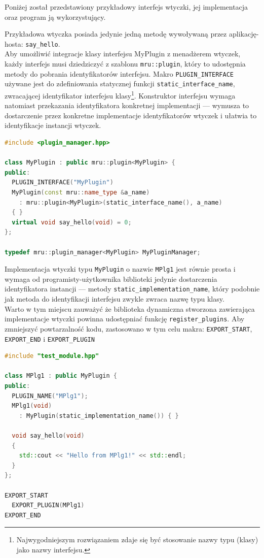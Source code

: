 \par
Poniżej został przedstawiony przykładowy interfejs wtyczki, jej implementacja oraz program ją wykorzystujący.

\par
Przykładowa wtyczka posiada jedynie jedną metodę wywoływaną przez aplikację-hosta: \texttt{say\_hello}.\\
Aby umożliwić integracje klasy interfejsu MyPlugin z menadżerem wtyczek, każdy interfejs musi dziedziczyć z szablonu \texttt{mru::plugin}, który to udostępnia metody do pobrania identyfikatorów interfejsu.
Makro \texttt{PLUGIN\_INTERFACE} używane jest do zdefiniowania statycznej funkcji \texttt{static\_interface\_name}, zwracającej identyfikator interfejsu klasy\footnote{Najwygodniejszym rozwiązaniem zdaje się być stosowanie nazwy typu (klasy) jako nazwy interfejsu.}.
Konstruktor interfejsu wymaga natomiast przekazania identyfikatora konkretnej implementacji --- wymusza to dostarczenie przez konkretne implementacje identyfikatorów wtyczek i ułatwia to identyfikacje instancji wtyczek.
\begin{lstlisting}[caption={ test\_module.hpp}, language=C++]
#include <plugin_manager.hpp>

class MyPlugin : public mru::plugin<MyPlugin> {
public:
  PLUGIN_INTERFACE("MyPlugin")
  MyPlugin(const mru::name_type &a_name)
    : mru::plugin<MyPlugin>(static_interface_name(), a_name)
  { }
  virtual void say_hello(void) = 0;
};

typedef mru::plugin_manager<MyPlugin> MyPluginManager;
\end{lstlisting}

\par
Implementacja wtyczki typu \texttt{MyPlugin} o nazwie \texttt{MPlg1} jest równie prosta i wymaga od programisty-użytkownika biblioteki jedynie dostarczenia identyfikatora instancji --- metody \texttt{static\_implementation\_name}, który podobnie jak metoda do identyfikacji interfejsu zwykle zwraca nazwę typu klasy.\\
Warto w tym miejscu zauważyć że biblioteka dynamiczna stworzona zawierająca implementacje wtyczki powinna udostępniać funkcję \texttt{register\_plugins}. Aby zmniejszyć powtarzalność kodu, zastosowano w tym celu makra: \texttt{EXPORT\_START}, \texttt{EXPORT\_END} i \texttt{EXPORT\_PLUGIN}
\begin{lstlisting}[caption={ test\_module.cpp}, language=C++]
#include "test_module.hpp"

class MPlg1 : public MyPlugin { 
public:
  PLUGIN_NAME("MPlg1");
  MPlg1(void)
    : MyPlugin(static_implementation_name()) { } 

  void say_hello(void)
  {
    std::cout << "Hello from MPlg1!" << std::endl;
  }
};

EXPORT_START
  EXPORT_PLUGIN(MPlg1)
EXPORT_END

\end{lstlisting}

